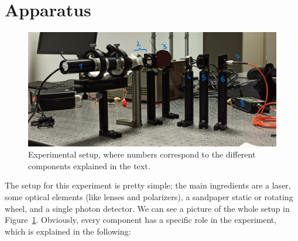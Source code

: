 \documentclass[prl,twocolumn]{revtex4-1}
\begin{document}
\section{Apparatus}
\begin{figure}
    \centering
    \includegraphics[width=\linewidth]{Images/setup.jpg}
    \caption{Experimental setup, where numbers correspond to the different components explained in the text.}
    \label{fig:setup}
\end{figure}

The setup for this experiment is pretty simple; the main ingredients are a laser, some optical elements (like lenses and polarizers), a sandpaper static or rotating wheel, and a single photon detector. We can see a picture of the whole setup in Figure~\ref{fig:setup}. Obviously, every component has a specific role in the experiment, which is explained in the following:
\end{document}
